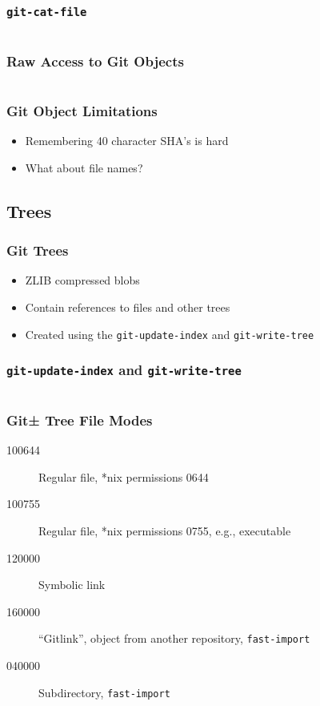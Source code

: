 \documentclass[]{beamer}
\begin{document}
\begin{frame}[fragile]
\frametitle{\texttt{git-cat-file}}
\inputminted{bash}{code/1/5}
\end{frame}

\begin{frame}[fragile]
\frametitle{Raw Access to Git Objects}
\inputminted{bash}{code/1/6}
\end{frame}

\begin{frame}
\frametitle{Git Object Limitations}
\begin{itemize}
\item{Remembering 40 character SHA's is hard}
\item{What about file names?}
\end{itemize}
\end{frame}

\subsection{Trees}

\begin{frame}
\frametitle{Git Trees}
\begin{itemize}
\item{ZLIB compressed blobs}
\item{Contain references to files and other trees}
\item{Created using the \texttt{git-update-index} and \texttt{git-write-tree}}
\end{itemize}
\end{frame}

\begin{frame}[fragile]
\frametitle{\texttt{git-update-index} and \texttt{git-write-tree}}
\inputminted[]{bash}{code/2/1}
\end{frame}

\begin{frame}
\frametitle{Git± Tree File Modes}
\begin{description}
\item[100644]{Regular file, *nix permissions 0644}
\item[100755]{Regular file, *nix permissions 0755, e.g., executable}
\item[120000]{Symbolic link}
\item[160000]{``Gitlink'', object from another repository, \texttt{fast-import}}
\item[040000]{Subdirectory, \texttt{fast-import}}
\end{description}
\end{frame}
\end{document}
